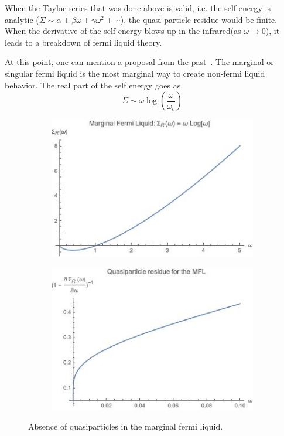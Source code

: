\par
When the Taylor series that was done above is valid, i.e. the self energy is analytic ($\Sigma \sim \alpha + \beta\omega + \gamma\omega^2 + \cdots$), the quasi-particle residue would be finite.
When the derivative of the self energy blows up in the infrared(as $\omega\xrightarrow{}0$), it leads to a breakdown of fermi liquid theory. 
\par
At this point, one can mention a proposal from the past~\cite{varma1989phenomenology,ruckenstein1991theory,varma1993towards,varma2002singular}. The marginal or singular fermi liquid is the most marginal way to create non-fermi liquid behavior.
The real part of the self energy goes as 
\begin{equation}
    \Sigma \sim \omega\log(\frac{\omega}{\omega_c})
\end{equation}
\begin{figure}
    \centering
    \begin{subfigure}[b]{0.4\textwidth}
    \centering
    \includegraphics[width = \textwidth]{figures/introduction/MFLS.jpeg}
    \end{subfigure}
    \begin{subfigure}[b]{0.4\textwidth}
    \centering
    \includegraphics[width = \textwidth]{figures/introduction/MFLZ.jpeg}
    \end{subfigure}
    \caption{Absence of quasiparticles in the marginal fermi liquid.}
    \label{fig:MFLZ}
\end{figure}

